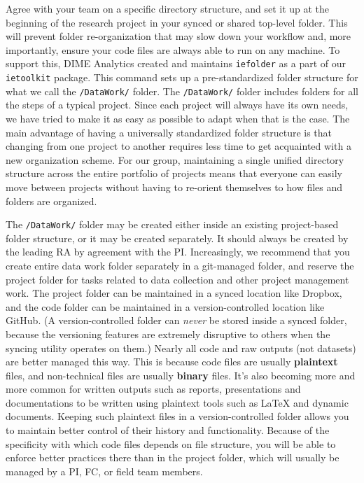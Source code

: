 Agree with your team on a specific directory structure, and
set it up at the beginning of the research project
in your synced or shared top-level folder.
This will prevent folder re-organization that may slow down your workflow and,
more importantly, ensure your code files are always able to run on any machine.
To support this, DIME Analytics created and maintains \texttt{iefolder}
as a part of our \texttt{ietoolkit} package.
This command sets up a pre-standardized folder structure for what we call the \texttt{/DataWork/} folder.
The \texttt{/DataWork/} folder includes folders for all the steps of a typical project.
Since each project will always have its own needs,
we have tried to make it as easy as possible to adapt when that is the case.
The main advantage of having a universally standardized folder structure
is that changing from one project to another requires less
time to get acquainted with a new organization scheme.
For our group, maintaining a single unified directory structure
across the entire portfolio of projects means that everyone
can easily move between projects without having to re-orient
themselves to how files and folders are organized.

The \texttt{/DataWork/} folder may be created either inside
an existing project-based folder structure, or it may be created separately.
It should always be created by the leading RA by agreement with the PI.
Increasingly, we recommend that you create entire data work folder
separately in a git-managed folder, and reserve the project folder
for tasks related to data collection and other project management work.
The project folder can be maintained in a synced location like Dropbox,
and the code folder can be maintained in a version-controlled location like GitHub.
(A version-controlled folder can \textit{never} be stored inside a synced folder,
because the versioning features are extremely disruptive to others
when the syncing utility operates on them.)
Nearly all code and raw outputs (not datasets) are better managed this way.
This is because code files are usually \textbf{plaintext} files,
and non-technical files are usually \textbf{binary} files.
It's also becoming more and more common for written outputs such as reports,
presentations and documentations to be written using plaintext
tools such as {\LaTeX} and dynamic documents.
Keeping such plaintext files in a version-controlled folder allows you
to maintain better control of their history and functionality.
Because of the specificity with which code files depends on file structure,
you will be able to enforce better practices there than in the project folder,
which will usually be managed by a PI, FC, or field team members.

